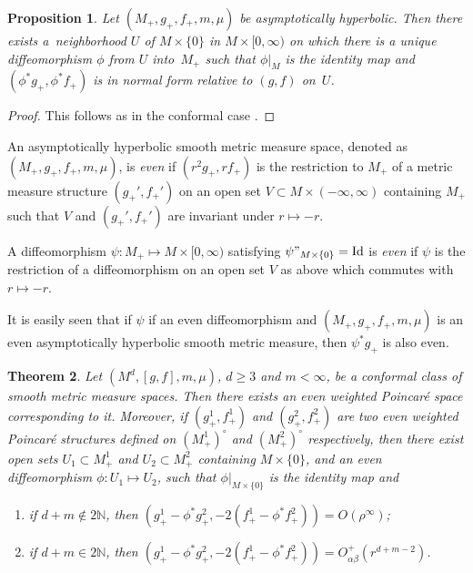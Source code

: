 \documentclass[pdftex]{sigma}
\newcommand{\psmms}{(M_+,g_+,f_+,m,\mu)}
\numberwithin{equation}{section}
\newtheorem{Theorem}{Theorem}[section]
\newtheorem{Proposition}[Theorem]{Proposition}
 { \theoremstyle{definition}
\newtheorem{Definition}[Theorem]{Definition}
\newtheorem{Note}[Theorem]{Note}
\newtheorem{Example}[Theorem]{Example}
\newtheorem{Remark}[Theorem]{Remark} }
\begin{document}
\begin{Proposition}
Let $\psmms$ be asymptotically hyperbolic. Then there exists a~neigh\-bor\-hood $U$ of $M\times \{0\}$ in $M\times [0,\infty)$ on which there is a unique diffeomorphism $\phi$ from $U$ into~$M_+$ such that ${\phi}|_{M}$ is the identity map and $(\phi^* g_+,\phi^* f_+)$ is in normal form relative to $(g,f)$ on~$U$.
\end{Proposition}
\begin{proof}
This follows as in the conformal case \cite[Proposition 4.3]{FeffermanGraham2012}.
\end{proof}

\begin{Definition}
{\sloppy
An asymptotically hyperbolic smooth metric measure space, denoted as $\psmms$, is \emph{even} if $(r^2 g_+,rf_+)$ is the restriction to $M_+$ of a metric measure structure $(g_+',f_+')$ on an open set $V\subset M\times (-\infty,\infty)$ containing $M_+$ such that $V$ and $(g_+',f_+')$ are invariant under $r\mapsto -r$.

}

A diffeomorphism $\psi\colon M_+\mapsto M\times [0,\infty)$ satisfying ${\psi}"_{{M\times \{0\}}}=\mathrm{Id}$ is \emph{even} if $\psi$ is the restriction of a diffeomorphism on an open set $V$ as above which commutes with $r\mapsto -r$.
\end{Definition}

It is easily seen that if $\psi$ if an even diffeomorphism and $\psmms$ is an even asymptotically hyperbolic smooth metric measure, then $\psi^{*}g_+$ is also even.

\begin{Theorem}
\label{existence-even-poincare}
Let $(M^d,[g,f],m,\mu)$, $d\geq 3$ and $m<\infty$, be a conformal class of smooth metric measure spaces. Then there exists an even weighted Poincar\'e space corresponding to it. Moreover, if $(g_+^1,f_+^1)$ and $(g_+^2,f_+^2)$ are two even weighted Poincar\'e structures defined on $(M_+^1)^{\circ}$ and $(M_+^2)^{\circ}$ respectively, then there exist open sets $U_1\subset M_+^1$ and $U_2\subset M_+^2$ containing $M\times \{0\}$, and an even diffeomorphism $\phi\colon U_1\mapsto U_2$, such that ${\phi}|_{{M\times \{0\}}}$ is the identity map and
\begin{enumerate}[label=$(\roman*)$]\itemsep=0pt

\item if $d+m\notin 2\mathbb{N}$, then $(g_+^1-\phi^*{g_+^2},-2(f_+^1-\phi^*f_+^2))=O(\rho^\infty)$;

\item if $d+m\in 2\mathbb{N}$, then $(g_+^1-\phi^*{g_+^2},-2(f_+^1-\phi^*f_+^2))=O_{\alpha\beta}^+(r^{d+m-2})$.
\end{enumerate}
\end{Theorem}
\end{document}
